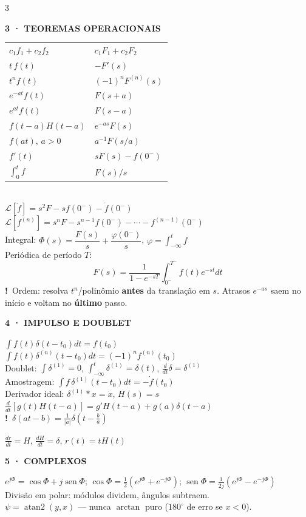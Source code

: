 \documentclass[10pt,a4paper]{article}
\newcommand{\sect}[1]{\vspace{1.2mm}{\color{acc}\rule{\linewidth}{0.9pt}}\vspace{-0.3mm}\par
  {\footnotesize\bfseries\color{acc}\MakeUppercase{#1}}\par\vspace{0.6mm}}
\newcommand{\warn}[1]{{\color{amb}\textbf{!}~#1}\par\vspace{0.4mm}}
\newcommand{\ci}{0^{-}}
\begin{document}
\begin{multicols}{3}
\sect{3 · Teoremas operacionais}
\begin{tabular}{@{}l@{\;\;}l@{}}
$c_1f_1+c_2f_2$ & $c_1F_1+c_2F_2$\\
$t\,f(t)$ & $-F'(s)$\\
$t^nf(t)$ & $(-1)^nF^{(n)}(s)$\\
$e^{-at}f(t)$ & $F(s+a)$\\
$e^{at}f(t)$ & $F(s-a)$\\
$f(t-a)H(t-a)$ & $e^{-as}F(s)$\\
$f(at),\,a>0$ & $a^{-1}F(s/a)$\\
$f'(t)$ & $sF(s)-f(\ci)$\\
$\int_0^t\! f$ & $F(s)/s$\\
\end{tabular}\\[0.8mm]
$\mathcal{L}[\ddot f]=s^2F-s f(\ci)-\dot f(\ci)$\\[0.4mm]
$\mathcal{L}[f^{(n)}]=s^nF-s^{n-1}f(\ci)-\cdots-f^{(n-1)}(\ci)$\\[0.4mm]
Integral: $\Phi(s)=\dfrac{F(s)}{s}+\dfrac{\varphi(\ci)}{s}$,\; $\varphi=\int_{-\infty}^{t}\!f$\\[0.8mm]
Periódica de período $T$:
\[F(s)=\frac{1}{1-e^{-sT}}\int_{\ci}^{T^-}\!\! f(t)e^{-st}dt\]
\warn{Ordem: resolva $t^n$/polinômio \textbf{antes} da translação em $s$. Atrasos $e^{-as}$ saem no início e voltam no \textbf{último} passo.}

\sect{4 · Impulso e doublet}
$\int f(t)\delta(t-t_0)dt=f(t_0)$\\[0.4mm]
$\int f(t)\delta^{(n)}(t-t_0)dt=(-1)^nf^{(n)}(t_0)$\\[0.4mm]
Doublet: $\int\delta^{(1)}=0$, $\int_{-\infty}^{t}\!\delta^{(1)}=\delta(t)$, $\frac{d}{dt}\delta=\delta^{(1)}$\\[0.4mm]
Amostragem: $\int f\,\delta^{(1)}(t-t_0)dt=-\dot f(t_0)$\\[0.4mm]
Derivador ideal: $\delta^{(1)}*x=\dot x$, $H(s)=s$\\[0.4mm]
$\frac{d}{dt}[g(t)H(t-a)]=g'H(t-a)+g(a)\delta(t-a)$\\[0.4mm]
\warn{$\delta(at-b)=\frac{1}{|a|}\delta\!\left(t-\frac{b}{a}\right)$}
$\frac{dr}{dt}=H$, $\frac{dH}{dt}=\delta$, $r(t)=tH(t)$

\sect{5 · Complexos}
$e^{j\Phi}=\cos\Phi+j\operatorname{sen}\Phi$;\; $\cos\Phi=\frac{1}{2}(e^{j\Phi}{+}e^{-j\Phi})$;\; $\operatorname{sen}\Phi=\frac{1}{2j}(e^{j\Phi}{-}e^{-j\Phi})$\\[0.4mm]
Divisão em polar: módulos dividem, ângulos subtraem.\\
$\psi=\operatorname{atan2}(y,x)$ — nunca $\arctan$ puro ($180^\circ$ de erro se $x<0$).


\end{multicols}
\end{document}
